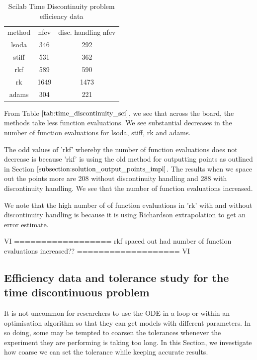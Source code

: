 \begin{table}[h]
\caption {Scilab Time Discontinuity problem efficiency data} 
    \label{tab:time_discontinuity_scilab} 
\begin{center}
\begin{tabular}{ c c c }
 method & nfev &  disc. handling nfev \\ 
    lsoda & 346  & 292 \\
    stiff & 531  & 362 \\
    rkf   & 589  & 590 \\
    rk    & 1649 & 1473 \\
    adams & 304  & 221  \\
\end{tabular}
\end{center}
\end{table}

From Table $\ref{tab:time_discontinuity_sci}$, we see that across the board, the methods take less function evaluations. We see substantial decreases in the number of function evaluations for lsoda, stiff, rk and adams.

The odd values of 'rkf' whereby the number of function evaluations does not decrease is because 'rkf' is using the old method for outputting points as outlined in Section $\ref{subsection:solution_output_points_impl}$. The results when we space out the points more are 208 without discontinuity handling and 288 with discontinuity handling. We see that the number of function evaluations increased.

We note that the high number of of function evaluations in 'rk' with and without discontinuity handling is because it is using Richardson extrapolation to get an error estimate.

VI ==================
rkf spaced out had number of function evaluations increased??
=================== VI

\subsection{Efficiency data and tolerance study for the time discontinuous problem}
\label{subsection:time_tolerance_study}
It is not uncommon for researchers to use the ODE in a loop or within an optimisation algorithm so that they can get models with different parameters. In so doing, some may be tempted to coarsen the tolerances whenever the experiment they are performing is taking too long. In this Section, we investigate how coarse we can set the tolerance while keeping accurate results. 

